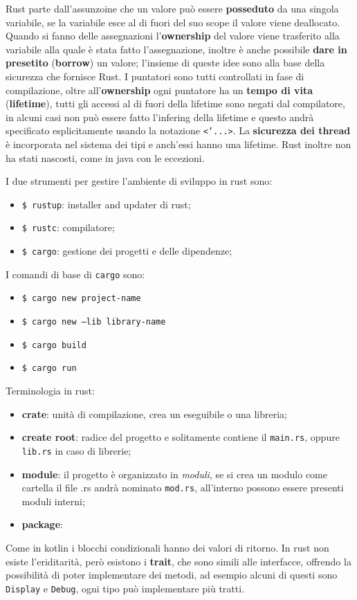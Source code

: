\documentclass[12pt]{article}
\begin{document}
Rust parte dall'assunzoine che un valore pu\`o essere \textbf{posseduto} da una singola variabile, se la variabile esce al di fuori del suo scope il valore viene deallocato. Quando si fanno delle assegnazioni l'\textbf{ownership} del valore viene trasferito alla variabile alla quale \`e stata fatto l'assegnazione, inoltre \`e anche possibile \textbf{dare in presetito} (\textbf{borrow}) un valore; l'insieme di queste idee sono alla base della sicurezza che fornisce Rust. I puntatori sono tutti controllati in fase di compilazione, oltre all'\textbf{ownership} ogni puntatore ha un \textbf{tempo di vita} (\textbf{lifetime}), tutti gli accessi al di fuori della lifetime sono negati dal compilatore, in alcuni casi non pu\`o essere fatto l'infering della lifetime e questo andr\`a specificato esplicitamente usando la notazione \texttt{<'...>}. La \textbf{sicurezza dei thread} \`e incorporata nel sistema dei tipi e anch'essi hanno una lifetime. Rust inoltre non ha stati nascosti, come in java con le eccezioni.

I due strumenti per gestire l'ambiente di sviluppo in rust sono:
\begin{itemize}
  \item \texttt{\$ rustup}: installer and updater di rust;
  \item \texttt{\$ rustc}: compilatore;
  \item \texttt{\$ cargo}: gestione dei progetti e delle dipendenze;
\end{itemize}
I comandi di base di \texttt{cargo} sono:
\begin{itemize}
  \item \texttt{\$ cargo new project-name}
  \item \texttt{\$ cargo new --lib library-name}
  \item \texttt{\$ cargo build}
  \item \texttt{\$ cargo run}
\end{itemize}
Terminologia in rust:
\begin{itemize}
  \item \textbf{crate}: unit\`a di compilazione, crea un eseguibile o una libreria;
  \item \textbf{create root}: radice del progetto e solitamente contiene il \texttt{main.rs}, oppure \texttt{lib.rs} in caso di librerie;
  \item \textbf{module}: il progetto \`e organizzato in \emph{moduli}, se si crea un modulo come cartella il file .rs andr\`a nominato \texttt{mod.rs}, all'interno possono essere presenti moduli interni;
  \item \textbf{package}: 
\end{itemize}
Come in kotlin i blocchi condizionali hanno dei valori di ritorno. In rust non esiste l'eriditarit\`a, per\`o esistono i \textbf{trait}, che sono simili alle interfacce, offrendo la possibilit\`a di poter implementare dei metodi, ad esempio alcuni di questi sono \texttt{Display} e \texttt{Debug}, ogni tipo pu\`o implementare pi\`u tratti.
\end{document}

